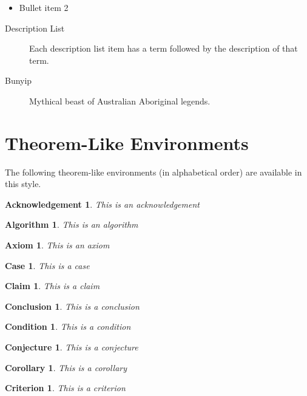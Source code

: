 \documentclass[letterpaper,12pt,openany,reqno]{book}%
\newtheorem{acknowledgement}[theorem]{Acknowledgement}
\newtheorem{algorithm}[theorem]{Algorithm}
\newtheorem{axiom}[theorem]{Axiom}
\newtheorem{case}[theorem]{Case}
\newtheorem{claim}[theorem]{Claim}
\newtheorem{conclusion}[theorem]{Conclusion}
\newtheorem{condition}[theorem]{Condition}
\newtheorem{conjecture}[theorem]{Conjecture}
\newtheorem{corollary}[theorem]{Corollary}
\newtheorem{criterion}[theorem]{Criterion}
\begin{document}
\begin{emumerate}
\begin{itemize}
\item Bullet item 2

\end{itemize}

\begin{description}
\item[Description List] Each description list item has a term followed by the
description of that term.

\item[Bunyip] Mythical beast of Australian Aboriginal legends.
\end{description}

\section{Theorem-Like Environments}

The following theorem-like environments (in alphabetical order) are available
in this style.

\begin{acknowledgement}
This is an acknowledgement
\end{acknowledgement}

\begin{algorithm}
This is an algorithm
\end{algorithm}

\begin{axiom}
This is an axiom
\end{axiom}

\begin{case}
This is a case
\end{case}

\begin{claim}
This is a claim
\end{claim}

\begin{conclusion}
This is a conclusion
\end{conclusion}

\begin{condition}
This is a condition
\end{condition}

\begin{conjecture}
This is a conjecture
\end{conjecture}

\begin{corollary}
This is a corollary
\end{corollary}

\begin{criterion}
This is a criterion
\end{criterion}


\end{emumerate}
\end{document}
